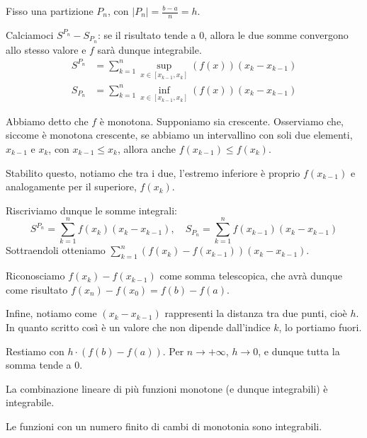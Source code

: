 \documentclass[12pt]{report}
\begin{document}
	\begin{dimostrazione}{}{}
		
		Fisso una partizione $P_n$, con $|P_n| = \frac{b-a}{n} = h$.
		
		Calciamoci $S^{P_n} - S_{P_n}$: se il risultato tende a $0$, allora le due somme convergono allo stesso valore e $f$ sarà dunque integrabile.
		\begin{align*}
			S^{P_n} &= \sum_{k=1}^{n} \sup_{x \in [x_{k-1}, x_k]} (f(x)) (x_k - x_{k-1}) \\
			S_{P_n} &= \sum_{k=1}^{n} \inf_{x \in [x_{k-1}, x_k]} (f(x)) (x_k - x_{k-1})
		\end{align*}
		
		Abbiamo detto che $f$ è monotona. Supponiamo sia crescente.
		Osserviamo che, siccome è monotona crescente, se abbiamo un intervallino con soli due elementi, $x_{k-1}$ e $x_k$, con $x_{k-1} \leq x_k$, allora anche $f(x_{k-1}) \leq f(x_k)$.
		
		Stabilito questo, notiamo che tra i due, l'estremo inferiore è proprio $f(x_{k-1})$ e analogamente per il superiore, $f(x_k)$.
		
		Riscriviamo dunque le somme integrali:
		\[
		S^{P_n} = \sum_{k=1}^{n} f(x_k) (x_k - x_{k-1}), \quad S_{P_n} = \sum_{k=1}^{n} f(x_{k-1}) (x_k - x_{k-1})
		\]
		Sottraendoli otteniamo $\sum_{k=1}^{n} (f(x_k) - f(x_{k-1})) (x_k - x_{k-1})$.
		
		Riconosciamo $f(x_k) - f(x_{k-1})$ come somma telescopica, che avrà dunque come risultato $f(x_n) - f(x_0) = f(b) - f(a)$.
		
		Infine, notiamo come $(x_k - x_{k-1})$ rappresenti la distanza tra due punti, cioè $h$. In quanto scritto così è un valore che non dipende dall'indice $k$, lo portiamo fuori.
		
		Restiamo con $h \cdot (f(b) - f(a))$. Per $n \to +\infty$, $h \to 0$, e dunque tutta la somma tende a $0$.
		
	\end{dimostrazione}
	
	\begin{osservazione}{}{}
		
		La combinazione lineare di più funzioni monotone (e dunque integrabili) è integrabile.
		
	\end{osservazione}
	
	\begin{proposizione}{}{}
		
		Le funzioni con un numero finito di cambi di monotonia sono integrabili.
		
	\end{proposizione}
	
\end{document}
